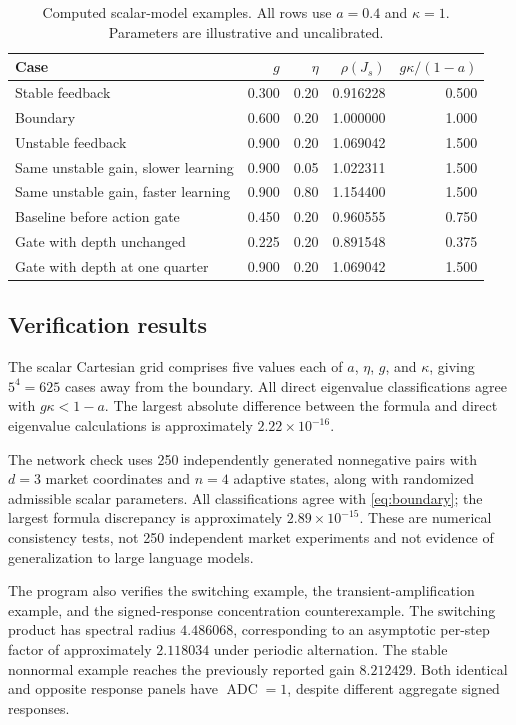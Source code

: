 \documentclass[11pt,a4paper]{article}
\theoremstyle{definition}
\theoremstyle{remark}
\newcommand{\ADC}{\operatorname{ADC}}
\begin{document}
\begin{table}[htbp]
\centering\small
\caption{Computed scalar-model examples. All rows use $a=0.4$ and $\kappa=1$. Parameters are illustrative and uncalibrated.}
\label{tab:scalar}
\begin{tabularx}{\textwidth}{Yrrrr}
\toprule
Case & $g$ & $\eta$ & $\rho(J_s)$ & $g\kappa/(1-a)$\\
\midrule
Stable feedback & 0.300 & 0.20 & 0.916228 & 0.500\\
Boundary & 0.600 & 0.20 & 1.000000 & 1.000\\
Unstable feedback & 0.900 & 0.20 & 1.069042 & 1.500\\
Same unstable gain, slower learning & 0.900 & 0.05 & 1.022311 & 1.500\\
Same unstable gain, faster learning & 0.900 & 0.80 & 1.154400 & 1.500\\
Baseline before action gate & 0.450 & 0.20 & 0.960555 & 0.750\\
Gate with depth unchanged & 0.225 & 0.20 & 0.891548 & 0.375\\
Gate with depth at one quarter & 0.900 & 0.20 & 1.069042 & 1.500\\
\bottomrule
\end{tabularx}
\end{table}

\subsection{Verification results}
The scalar Cartesian grid comprises five values each of $a$, $\eta$, $g$, and $\kappa$, giving $5^4=625$ cases away from the boundary. All direct eigenvalue classifications agree with $g\kappa<1-a$. The largest absolute difference between the formula and direct eigenvalue calculations is approximately $2.22\times10^{-16}$.

The network check uses 250 independently generated nonnegative pairs with $d=3$ market coordinates and $n=4$ adaptive states, along with randomized admissible scalar parameters. All classifications agree with \cref{eq:boundary}; the largest formula discrepancy is approximately $2.89\times10^{-15}$. These are numerical consistency tests, not 250 independent market experiments and not evidence of generalization to large language models.

The program also verifies the switching example, the transient-amplification example, and the signed-response concentration counterexample. The switching product has spectral radius $4.486068$, corresponding to an asymptotic per-step factor of approximately $2.118034$ under periodic alternation. The stable nonnormal example reaches the previously reported gain $8.212429$. Both identical and opposite response panels have $\ADC=1$, despite different aggregate signed responses.
\end{document}
